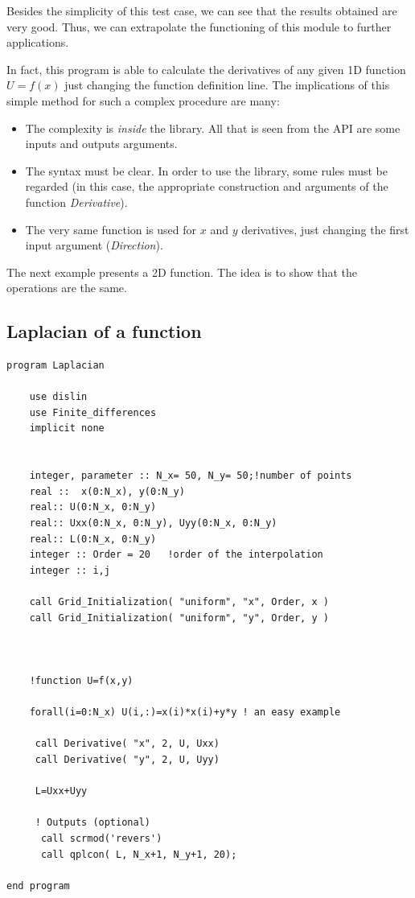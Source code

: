 Besides the simplicity of this test case, we can see that the results obtained
are very good. Thus, we can extrapolate the functioning of this module to further applications. \\

\vspace{1cm}

In fact,  this program is able to calculate the derivatives of any
given 1D function $U=f(x)$ just changing the function definition line. The implications of this
simple method for such a complex procedure are many: 
\begin{itemize}
  \item The complexity is \textit{inside} the library. All that is seen from the
  API are some inputs and outputs arguments. 
  \item The syntax must be clear. In order to use the library, some rules must
  be regarded (in this case, the appropriate construction and arguments of the
  function \textit{Derivative}).
  \item The very same function is used for $x$ and $y$ derivatives, just
  changing the first input argument (\textit{Direction}).
\end{itemize}

The next example presents a 2D function. The idea is to show that the operations
are the same.\\

\newpage


\subsection{Laplacian of a function}
\label{laplacian}
\begin{blueframed}
\begin{lstlisting}
program Laplacian

	use dislin
	use Finite_differences
	implicit none
	
	
  	integer, parameter :: N_x= 50, N_y= 50;!number of points
  	real ::  x(0:N_x), y(0:N_y)
	real:: U(0:N_x, 0:N_y)
	real:: Uxx(0:N_x, 0:N_y), Uyy(0:N_x, 0:N_y)
	real:: L(0:N_x, 0:N_y)
	integer :: Order = 20	!order of the interpolation
	integer :: i,j

	call Grid_Initialization( "uniform", "x", Order, x )
	call Grid_Initialization( "uniform", "y", Order, y )
	
	
	
	!function U=f(x,y)
	
	forall(i=0:N_x) U(i,:)=x(i)*x(i)+y*y ! an easy example
	
	 call Derivative( "x", 2, U, Uxx) 
	 call Derivative( "y", 2, U, Uyy) 

	 L=Uxx+Uyy
	 
	 ! Outputs (optional)
	  call scrmod('revers') 
	  call qplcon( L, N_x+1, N_y+1, 20);

end program
\end{lstlisting}
\end{blueframed}

